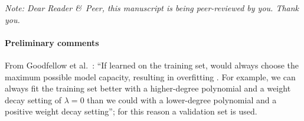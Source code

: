 \documentclass[\ifafour a4paper,12pt,\else a5paper,10pt,\fi%
onecolumn,oneside,article,%
british%
]{memoir}
\title{\propertitle}
\author{%
\iftrue%
\hspace*{\stretch{1}}%
\parbox{0.5\linewidth}%
{\protect\centering Andr\'es\\%
\footnotesize\epost{\email{ivan.a.davidovich}{ntnu.no}}}%
\hspace*{\stretch{1}}%
\parbox{0.5\linewidth}%
{\protect\centering Luca\\%
\footnotesize\epost{\email{piero.mana}{ntnu.no}}}%
\hspace*{\stretch{1}}%
\else%
Luca\\{\footnotesize\epost{\email{piero.mana}{ntnu.no}}%
}\fi%
}
\date{Draft of \today\ (first drafted \firstdraft)}
\theoremstyle{remark}
\theoremstyle{innote}
\newcommand*{\citey}{\parencites*}
\newcommand*{\amp}{\&}
\newcommand*{\asudedication}[1]{%
{\par\centering\textit{#1}\par}}
\renewcommand*{\|}{\mathpunct{|}}
\newcommand*{\etal}{{et al.}}
\newcommand*{\puzzle}{\maltese}
\newcommand{\mynote}[1]{ {\color{notecolour}\puzzle\ #1}}
\begin{document}
\captiondelim{\quad}\captionnamefont{\footnotesize}\captiontitlefont{\footnotesize}
\frenchspacing

\maketitle
\ifpublic
\abstractrunin
\abslabeldelim{}
\renewcommand*{\abstractname}{}
\setlength{\absleftindent}{0pt}
\setlength{\absrightindent}{0pt}
\setlength{\abstitleskip}{-\absparindent}
\begin{abstract}%
  \noindent \mynote{rewrite} The use of generalization error for testing and the phenomenon
  of overtraining are explained geometrically and given a Bayesian
  interpretation.
\end{abstract}\fi

\frenchspacing


\iftrue
\noindent\emph{\footnotesize Note: Dear Reader \amp\ Peer, this manuscript is
  being peer-reviewed by you. Thank you.}
\fi

\paragraph{Preliminary comments}

From Goodfellow \etal\ \citey{goodfellowetal2016}: \enquote{If learned on
  the training set, 
  would always choose the maximum possible model capacity, resulting in
  overfitting \textelp{}. For example, we can always fit the training set
  better with a higher-degree polynomial and a weight decay setting of
  $\lambda = 0$ than we could with a lower-degree polynomial and a positive
  weight decay setting}; for this reason a validation set is used.
\end{document}
